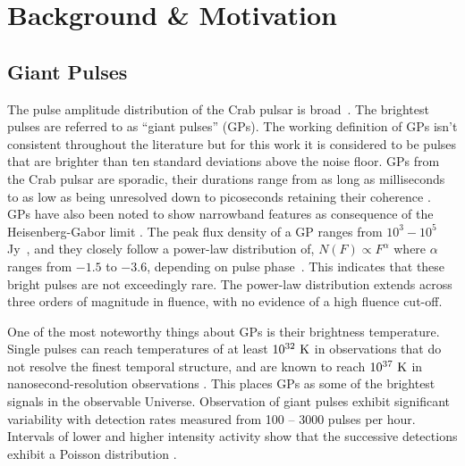 \section{Background \& Motivation} \label{sec:bkginfo}

\subsection{Giant Pulses}
The pulse amplitude distribution of the Crab pulsar is broad~\citep{hje15}. The brightest pulses are referred to as ``giant pulses'' (GPs). The working definition of GPs isn't consistent throughout the literature but for this work it is considered to be pulses that are brighter than ten standard deviations above the noise floor. GPs from the Crab pulsar are sporadic, their durations range from as long as milliseconds to as low as being unresolved down to picoseconds retaining their coherence \citep{jessner_giant_2010,thulasiram_narrow-band_2021}. GPs have also been noted to show narrowband features as consequence of the Heisenberg-Gabor limit \citep{bij_kinematics_2021}. The peak flux density of a GP ranges from $10^{3}-10^{5}$ Jy~\citep{thulasiram_narrow-band_2021}, and they closely follow a power-law distribution of, $N(F)\propto F^\alpha$ where $\alpha$ ranges from $-1.5$ to $-3.6$, depending on pulse phase~\citep{sokolowski_100_2025, karuppusamy_giant_2010}. This indicates that these bright pulses are not exceedingly rare. The power-law distribution extends across three orders of magnitude in fluence, with no evidence of a high fluence cut-off. 

One of the most noteworthy things about GPs is their brightness temperature. Single pulses can reach temperatures of at least $10^{32}~\rm K$ in observations that do not resolve the finest temporal structure, and are known to reach $10^{37}~\rm K$ in nanosecond-resolution observations \citep{cordes_brightest_2004}. This places GPs as some of the brightest signals in the observable Universe. Observation of giant pulses exhibit significant variability with detection rates measured from 100 -- 3000 pulses per hour. Intervals of lower and higher intensity activity show that the successive detections exhibit a Poisson distribution \citep{sokolowski_100_2025}.

